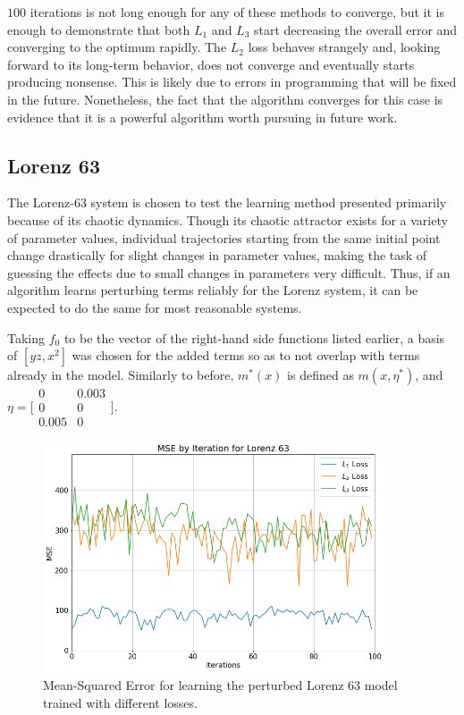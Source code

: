 \documentclass[12pt]{article}
\begin{document}
$100$ iterations is not long enough for any of these methods to converge, but it is enough to demonstrate that both $L_1$ and $L_3$ start decreasing the overall error and converging to the optimum rapidly. The $L_2$ loss behaves strangely and, looking forward to its long-term behavior, does not converge and eventually starts producing nonsense. This is likely due to errors in programming that will be fixed in the future. Nonetheless, the fact that the algorithm converges for this case is evidence that it is a powerful algorithm worth pursuing in future work.



\subsection{Lorenz 63}

The Lorenz-63 system is chosen to test the learning method presented primarily because of its chaotic dynamics. Though its chaotic attractor exists for a variety of parameter values, individual trajectories starting from the same initial point change drastically for slight changes in parameter values, making the task of guessing the effects due to small changes in parameters very difficult. Thus, if an algorithm learns perturbing terms reliably for the Lorenz system, it can be expected to do the same for most reasonable systems.

Taking $f_0$ to be the vector of the right-hand side functions listed earlier, a basis of $[y z, x^2]$ was chosen for the added terms so as to not overlap with terms already in the model. Similarly to before, $m^*(x)$ is defined as $m(x,\eta^*)$, and
$\eta = \big[\begin{smallmatrix}
  0 & 0.003\\
  0 & 0\\
  0.005 & 0
  \end{smallmatrix}\big].$

\begin{figure}[ht]
  \centering
  \includegraphics[width=0.9\textwidth]{mse-l63.png}
  \caption{Mean-Squared Error for learning the perturbed Lorenz 63 model trained with different losses.}
\end{figure}
\end{document}
